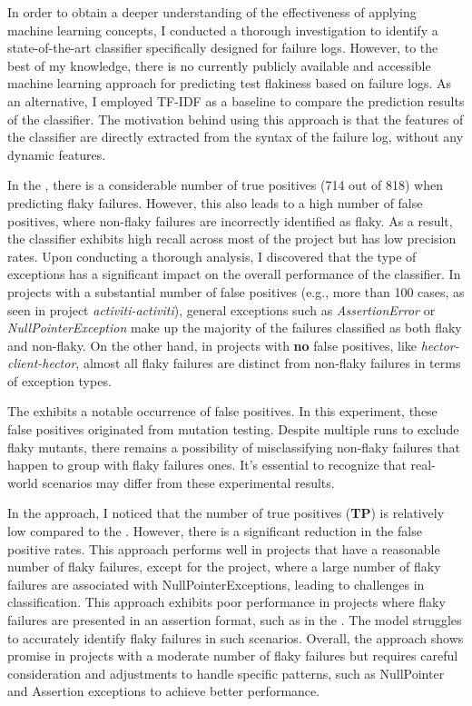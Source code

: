 In order to obtain a deeper understanding of the effectiveness of applying machine learning concepts, I conducted a thorough investigation to identify a state-of-the-art classifier specifically designed for failure logs. However, to the best of my knowledge, there is no currently publicly available and accessible machine learning approach for predicting test flakiness based on failure logs. As an alternative, I employed TF-IDF as a baseline to compare the prediction results of the classifier. The motivation behind using this approach is that the features of the classifier are directly extracted from the syntax of the failure log, without any dynamic features.




In the \classifier, there is a considerable number of true positives (714 out of 818) when predicting flaky failures. However, this also leads to a high number of false positives, where non-flaky failures are incorrectly identified as flaky. As a result, the classifier exhibits high recall across most of the project but has low precision rates.
Upon conducting a thorough analysis, I discovered that the type of exceptions has a significant impact on the overall performance of the classifier. In projects with a substantial number of false positives (e.g., more than 100 cases, as seen in project \emph{activiti-activiti}), general exceptions such as \emph{AssertionError} or \emph{NullPointerException} make up the majority of the failures classified as both flaky and non-flaky.
On the other hand, in projects with \textbf{no} false positives, like \emph{hector-client-hector}, almost all flaky failures are distinct from non-flaky failures in terms of exception types.
 

The \classifier exhibits a notable occurrence of false positives. In this experiment, these false positives originated from mutation testing. Despite multiple runs to exclude flaky mutants, there remains a possibility of misclassifying non-flaky failures that happen to group with flaky failures ones. It's essential to recognize that real-world scenarios may differ from these experimental results.

In the \tfidf approach, I noticed that the number of true positives (\textbf{TP}) is relatively low compared to the \classifier. However, there is a significant reduction in the false positive rates. This approach performs well in projects that have a reasonable number of flaky failures, except for the \alluxio project, where a large number of flaky failures are associated with NullPointerExceptions, leading to challenges in classification.
This \tfidf approach exhibits poor performance in projects where flaky failures are presented in an assertion format, such as in the \websocket. The model struggles to accurately identify flaky failures in such scenarios.
Overall, the \tfidf approach shows promise in projects with a moderate number of flaky failures but requires careful consideration and adjustments to handle specific patterns, such as NullPointer and Assertion exceptions to achieve better performance. 




